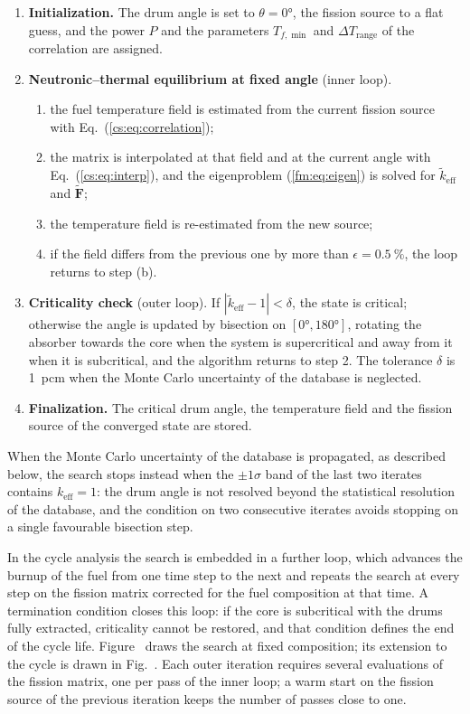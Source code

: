 \begin{enumerate}
  \item \textbf{Initialization.} The drum angle is set to $\theta=\ang{0}$, the
  fission source to a flat guess, and the power $P$ and the parameters
  $T_{f,\min}$ and $\Delta T_{\mathrm{range}}$ of the correlation are assigned.
  \item \textbf{Neutronic--thermal equilibrium at fixed angle} (inner loop).
  \begin{enumerate}
    \item the fuel temperature field is estimated from the current fission
    source with Eq.~(\ref{cs:eq:correlation});
    \item the matrix is interpolated at that field and at the current angle
    with Eq.~(\ref{cs:eq:interp}), and the eigenproblem
    (\ref{fm:eq:eigen}) is solved for $\tilde k_{\mathrm{eff}}$ and
    $\tilde{\mathbf F}$;
    \item the temperature field is re-estimated from the new source;
    \item if the field differs from the previous one by more than
    $\epsilon=\SI{0.5}{\percent}$, the loop returns to step (b).
  \end{enumerate}
  \item \textbf{Criticality check} (outer loop). If
  $|\tilde k_{\mathrm{eff}}-1|<\delta$, the state is critical; otherwise the
  angle is updated by bisection on $[\ang{0},\ang{180}]$, rotating the absorber
  towards the core when the system is supercritical and away from it when it
  is subcritical, and the algorithm returns to step 2. The tolerance $\delta$ is
  \SI{1}{pcm} when the Monte Carlo uncertainty of the database is neglected.
  \item \textbf{Finalization.} The critical drum angle, the temperature field
  and the fission source of the converged state are stored.
\end{enumerate}

When the Monte Carlo uncertainty of the database is propagated, as described
below, the search stops instead when the $\pm1\sigma$ band of the
last two iterates contains $k_{\mathrm{eff}}=1$: the drum angle is not resolved beyond the statistical
resolution of the database, and the condition on two consecutive iterates
avoids stopping on a single favourable bisection step.

In the cycle analysis the search is embedded in a further loop, which advances
the burnup of the fuel from one time step to the next and repeats the search at
every step on the fission matrix corrected for the fuel composition at that
time. A termination condition closes this loop: if the core is subcritical
with the drums fully extracted, criticality cannot be restored, and that
condition defines the end of the cycle life. Figure~
draws the search at fixed composition; its extension to the cycle is drawn in
Fig.~. Each outer iteration requires several evaluations of
the fission matrix, one per pass of the inner loop; a warm start on the
fission source of the previous iteration keeps the number of passes close to
one.

